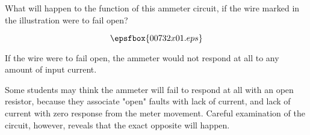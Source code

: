 

What will happen to the function of this ammeter circuit, if the wire marked in the illustration were to fail open?

$$\epsfbox{00732x01.eps}$$







If the wire were to fail open, the ammeter would not respond at all to any amount of input current.







Some students may think the ammeter will fail to respond at all with an open resistor, because they associate "open" faults with lack of current, and lack of current with zero response from the meter movement.  Careful examination of the circuit, however, reveals that the exact opposite will happen.



